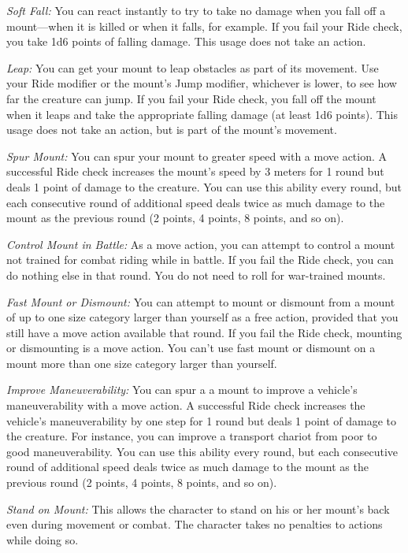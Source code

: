 \textit{Soft Fall:} You can react instantly to try to take no damage when you fall off a mount---when it is killed or when it falls, for example. If you fail your Ride check, you take 1d6 points of falling damage. This usage does not take an action.

\textit{Leap:} You can get your mount to leap obstacles as part of its movement. Use your Ride modifier or the mount's Jump modifier, whichever is lower, to see how far the creature can jump. If you fail your Ride check, you fall off the mount when it leaps and take the appropriate falling damage (at least 1d6 points). This usage does not take an action, but is part of the mount's movement.

\textit{Spur Mount:} You can spur your mount to greater speed with a move action. A successful Ride check increases the mount's speed by 3 meters for 1 round but deals 1 point of damage to the creature. You can use this ability every round, but each consecutive round of additional speed deals twice as much damage to the mount as the previous round (2 points, 4 points, 8 points, and so on).

\textit{Control Mount in Battle:} As a move action, you can attempt to control a mount not trained for combat riding while in battle. If you fail the Ride check, you can do nothing else in that round. You do not need to roll for war-trained mounts.

\textit{Fast Mount or Dismount:} You can attempt to mount or dismount from a mount of up to one size category larger than yourself as a free action, provided that you still have a move action available that round. If you fail the Ride check, mounting or dismounting is a move action. You can't use fast mount or dismount on a mount more than one size category larger than yourself.

\textit{Improve Maneuverability:} You can spur a a mount to improve a vehicle's maneuverability with a move action. A successful Ride check increases the vehicle's maneuverability by one step for 1 round but deals 1 point of damage to the creature. For instance, you can improve a transport chariot from poor to good maneuverability. You can use this ability every round, but each consecutive round of additional speed deals twice as much damage to the mount as the previous round (2 points, 4 points, 8 points, and so on).

\textit{Stand on Mount:} This allows the character to stand on his or her mount’s back even during movement or combat. The character takes no penalties to actions while doing so.

